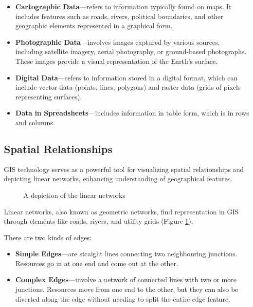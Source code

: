 \begin{itemize}
    \item \textbf{Cartographic Data}---refers to information typically found on maps. It includes features such as roads, rivers, political boundaries, and other geographic elements represented in a graphical form.
    \item \textbf{Photographic Data}---involves images captured by various sources, including satellite imagery, aerial photography, or ground-based photographs. These images provide a visual representation of the Earth's surface.
    \item \textbf{Digital Data}---refers to information stored in a digital format, which can include vector data (points, lines, polygons) and raster data (grids of pixels representing surfaces).
    \item \textbf{Data in Spreadsheets}---includes information in table form, which is in rows and columns.
\end{itemize}

\subsection{Spatial Relationships}

GIS technology serves as a powerful tool for visualizing spatial relationships and depicting linear networks, enhancing understanding of geographical features. 

\begin{figure}[ht]
	\centering
	
	\caption{A depiction of the linear networks}
	\label{fig:gis-linear-networks}
\end{figure}

Linear networks, also known as geometric networks, find representation in GIS through elements like roads, rivers, and utility grids (Figure \ref{fig:gis-linear-networks}).

There are two kinds of edges:
\begin{itemize}
    \item \textbf{Simple Edges}---are straight lines connecting two neighbouring junctions. Resources go in at one end and come out at the other.
    \item \textbf{Complex Edges}---involve a network of connected lines with two or more junctions. Resources move from one end to the other, but they can also be diverted along the edge without needing to split the entire edge feature.
\end{itemize}


